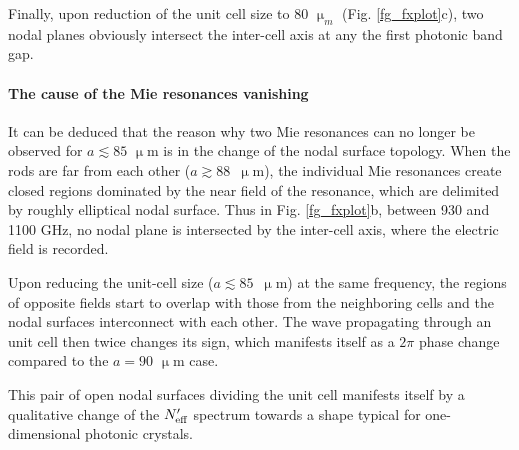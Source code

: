 Finally, upon reduction of the unit cell size to $80$ $\upmu_m$ (Fig. \ref{fg_fxplot}c), two nodal planes obviously intersect the inter-cell axis at any the first photonic band gap. %

\paragraph{The cause of the Mie resonances vanishing}%
It can be deduced that the reason why two Mie resonances can no longer be observed for $a\lesssim 85$ $\upmu$m is in the change of the nodal surface topology. When the rods are far from each other ($a\gtrsim 88$~$\upmu$m), the individual Mie resonances create closed regions dominated by the near field of the resonance, which are delimited by roughly elliptical nodal surface. Thus in Fig.  \ref{fg_fxplot}b, between 930 and 1100 GHz,  %
no nodal plane is intersected by the inter-cell axis, where the electric field is recorded.

Upon reducing the unit-cell size ($a\lesssim 85$~$\upmu$m) at the same frequency, the regions of opposite fields start to overlap with those from the neighboring cells and the nodal surfaces interconnect with each other. The wave propagating through an unit cell then twice changes its sign, which manifests itself as a $2\pi$ phase change compared to the $a=90$ $\upmu$m case. 

This pair of open nodal surfaces dividing the unit cell manifests itself by a qualitative change of the $N_{\text{eff} }'$ spectrum towards a shape typical for one-dimensional photonic crystals.






